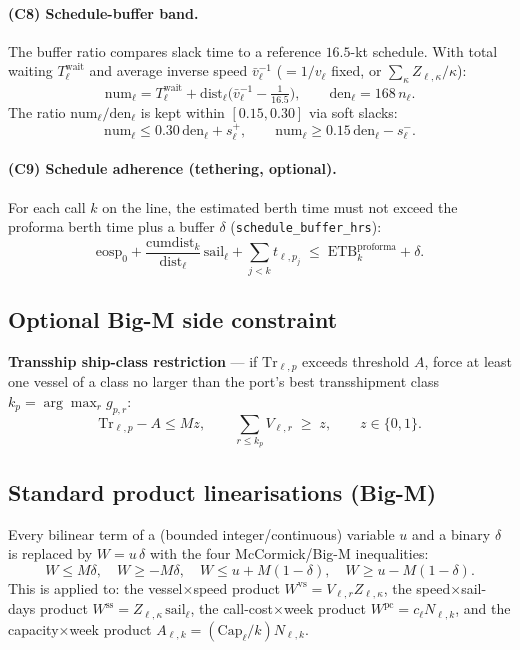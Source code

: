 \documentclass[11pt]{article}
\newcommand{\Tr}{\mathrm{Tr}}
\newcommand{\Cap}{\mathrm{Cap}}
\newcommand{\sail}{\mathrm{sail}}
\newcommand{\dist}{\mathrm{dist}}
\begin{document}
\paragraph{(C8) Schedule-buffer band.} The buffer ratio compares slack time to a
reference $16.5$-kt schedule. With total waiting $T^{\text{wait}}_\ell$ and average
inverse speed $\bar v^{-1}_\ell$ ($=1/v_\ell$ fixed, or $\sum_\kappa Z_{\ell,\kappa}/\kappa$):
\begin{equation}
  \mathrm{num}_\ell = T^{\text{wait}}_\ell + \dist_\ell\Big(\bar v^{-1}_\ell - \tfrac{1}{16.5}\Big),
  \qquad
  \mathrm{den}_\ell = 168\, n_\ell .
\end{equation}
The ratio $\mathrm{num}_\ell/\mathrm{den}_\ell$ is kept within $[0.15,0.30]$ via soft
slacks:
\begin{equation}
  \mathrm{num}_\ell \le 0.30\,\mathrm{den}_\ell + s^{+}_\ell,
  \qquad
  \mathrm{num}_\ell \ge 0.15\,\mathrm{den}_\ell - s^{-}_\ell .
\end{equation}

\paragraph{(C9) Schedule adherence (tethering, optional).} For each call $k$ on the
line, the estimated berth time must not exceed the proforma berth time plus a buffer
$\delta$ (\texttt{schedule\_buffer\_hrs}):
\begin{equation}
  \text{eosp}_0 + \frac{\mathrm{cumdist}_k}{\dist_\ell}\,\sail_\ell
  + \sum_{j<k} t_{\ell,p_j}
  \;\le\; \text{ETB}^{\text{proforma}}_k + \delta .
\end{equation}

\subsection{Optional Big-M side constraint}
\textbf{Transship ship-class restriction} --- if $\Tr_{\ell,p}$ exceeds threshold $A$,
force at least one vessel of a class no larger than the port's best transshipment class
$k_p=\arg\max_r g_{p,r}$:
\begin{equation}
  \Tr_{\ell,p} - A \le M z,
  \qquad \sum_{r\le k_p} V_{\ell,r} \;\ge\; z, \qquad z\in\{0,1\}.
\end{equation}

\subsection{Standard product linearisations (Big-M)}
\label{sec:bigm}
Every bilinear term of a (bounded integer/continuous) variable $u$ and a binary
$\delta$ is replaced by $W=u\,\delta$ with the four McCormick/Big-M inequalities:
\begin{equation}
  W \le M\delta,\quad W \ge -M\delta,\quad
  W \le u + M(1-\delta),\quad W \ge u - M(1-\delta).
\end{equation}
This is applied to: the vessel$\times$speed product
$W^{\text{vs}}=V_{\ell,r}Z_{\ell,\kappa}$, the speed$\times$sail-days product
$W^{\text{ss}}=Z_{\ell,\kappa}\,\sail_\ell$, the call-cost$\times$week product
$W^{\text{pc}}=c_\ell N_{\ell,k}$, and the capacity$\times$week product
$A_{\ell,k}=(\Cap_\ell/k)N_{\ell,k}$.
\end{document}
